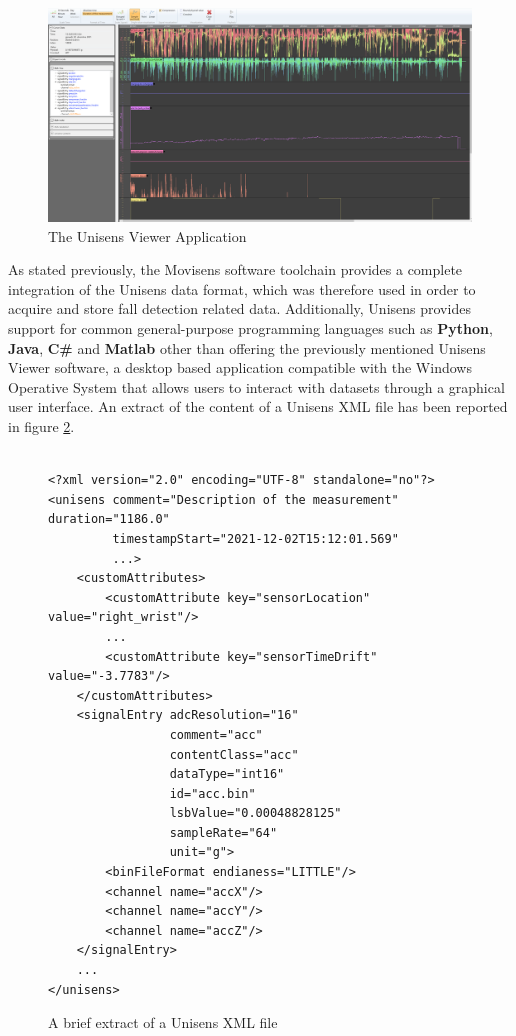\vspace{5mm}

\begin{figure}[h!]
    \centering
    \includegraphics[width=15cm]{./images/unisens_viewer.png}
    \caption{The Unisens Viewer Application}
    \label{fig:unisens-viewer-gui}
\end{figure}

As stated previously, the Movisens software toolchain provides a complete integration of the Unisens data format, which was therefore used in order to acquire and store fall detection related data. Additionally, Unisens provides support for common general-purpose programming languages such as \textbf{Python}, \textbf{Java}, \textbf{C\#} and \textbf{Matlab} other than offering the previously mentioned Unisens Viewer software, a desktop based application compatible with the Windows Operative System that allows users to interact with datasets through a graphical user interface. An extract of the content of a Unisens XML file has been reported in figure \ref{fig:unisens-xml}.

\vspace{20mm}

\begin{figure}[H]
\begin{verbatim}

<?xml version="2.0" encoding="UTF-8" standalone="no"?>
<unisens comment="Description of the measurement" duration="1186.0"
         timestampStart="2021-12-02T15:12:01.569"
         ...>
    <customAttributes>
        <customAttribute key="sensorLocation" value="right_wrist"/>
        ...
        <customAttribute key="sensorTimeDrift" value="-3.7783"/>
    </customAttributes>
    <signalEntry adcResolution="16"
                 comment="acc"
                 contentClass="acc"
                 dataType="int16"
                 id="acc.bin"
                 lsbValue="0.00048828125"
                 sampleRate="64"
                 unit="g">
        <binFileFormat endianess="LITTLE"/>
        <channel name="accX"/>
        <channel name="accY"/>
        <channel name="accZ"/>
    </signalEntry>
    ...
</unisens>
\end{verbatim}
\caption{A brief extract of a Unisens XML file}
\label{fig:unisens-xml}
\end{figure}


